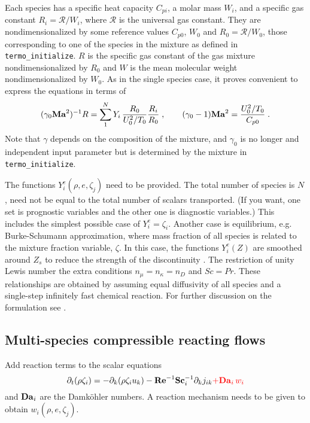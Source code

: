 Each species has a specific heat capacity $C_{pi}$, a molar mass $W_i$, and a specific gas constant $R_i=\mathcal{R}/W_i$, where  $\mathcal{R}$ is the universal gas constant. They are nondimensionalized by some reference values $C_{p0}$, $W_0$ and $R_0=\mathcal{R}/W_0$, those corresponding to one of the species in the mixture as defined in \texttt{termo\_initialize}. $R$ is the specific gas constant of the gas mixture nondimensionalized by $R_0$ and $W$ is the mean molecular weight nondimensionalized by $W_0$. As in the single species case, it proves convenient to express the equations in terms of
\begin{equation}
    (\gamma_0\mathrm{\bf Ma}^2)^{-1}R=\sum_1^NY_i\,\frac{R_0}{U^2_0/T_0}\frac{R_i}{R_0}\;,\qquad (\gamma_0-1)\mathrm{\bf Ma}^2 =\frac{U_0^2/T_0}{C_{p0}} \;.
\end{equation}
Note that $\gamma$ depends on the composition of the mixture, and $\gamma_0$ is no longer and independent input parameter but is determined by the mixture in \texttt{termo\_initialize}.

The functions $Y_i^e(\rho,e,\zeta_j)$ need to be provided. The total number of species is $N$, need not be equal to the total number of scalars transported. (If you want, one set is prognostic variables and the other one is diagnostic variables.) This includes the simplest possible case of $Y_i^e = \zeta_i$. Another case is equilibrium, e.g. Burke-Schumann approximation, where mass fraction of all species is related to the mixture fraction variable, $\zeta$.  In this case, the functions $Y_i^e(Z)$ are smoothed around $Z_s$ to reduce the strength of the discontinuity \citep{Higuera:1994}. The restriction of unity Lewis number the extra conditions $n_\mu=n_\kappa=n_D$ and $Sc=Pr$. These relationships are obtained by assuming equal diffusivity of all species and a single-step infinitely fast chemical reaction.  For further discussion on the formulation see \cite{Williams:1985}.

\subsection{Multi-species compressible reacting flows}

Add reaction terms to the scalar equations
\begin{equation}
  \partial_t (\rho \zeta_i)= -\partial_k (\rho \zeta_i u_k)
  - \mathrm{\bf Re}^{-1}\mathrm{\bf Sc}_i^{-1} \partial_k j_{ik} \color{red}{+\mathrm{\bf Da}_i\,w_i}
\end{equation}
and $\mathrm{\bf Da}_i$ are the Damk{\"o}hler numbers. A reaction mechanism needs to be given to obtain $w_i(\rho,e,\zeta_j)$.

